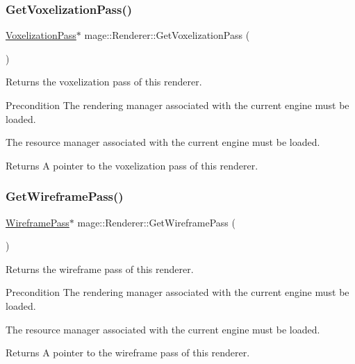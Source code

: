 \subsubsection{\texorpdfstring{Get\+Voxelization\+Pass()}{GetVoxelizationPass()}}
{\footnotesize\ttfamily \hyperlink{classmage_1_1_voxelization_pass}{Voxelization\+Pass}$\ast$ mage\+::\+Renderer\+::\+Get\+Voxelization\+Pass (\begin{DoxyParamCaption}{ }\end{DoxyParamCaption})}

Returns the voxelization pass of this renderer.

\begin{DoxyPrecond}{Precondition}
The rendering manager associated with the current engine must be loaded. 

The resource manager associated with the current engine must be loaded. 
\end{DoxyPrecond}
\begin{DoxyReturn}{Returns}
A pointer to the voxelization pass of this renderer. 
\end{DoxyReturn}
\hypertarget{classmage_1_1_renderer_a8069fab64b56b69dca3d9a8a5ebc3f8e}{}\label{classmage_1_1_renderer_a8069fab64b56b69dca3d9a8a5ebc3f8e} 
\subsubsection{\texorpdfstring{Get\+Wireframe\+Pass()}{GetWireframePass()}}
{\footnotesize\ttfamily \hyperlink{classmage_1_1_wireframe_pass}{Wireframe\+Pass}$\ast$ mage\+::\+Renderer\+::\+Get\+Wireframe\+Pass (\begin{DoxyParamCaption}{ }\end{DoxyParamCaption})}

Returns the wireframe pass of this renderer.

\begin{DoxyPrecond}{Precondition}
The rendering manager associated with the current engine must be loaded. 

The resource manager associated with the current engine must be loaded. 
\end{DoxyPrecond}
\begin{DoxyReturn}{Returns}
A pointer to the wireframe pass of this renderer. 
\end{DoxyReturn}
\hypertarget{classmage_1_1_renderer_a2762ead5f771ae95e4293cd7eb1a2834}{}\label{classmage_1_1_renderer_a2762ead5f771ae95e4293cd7eb1a2834} 

